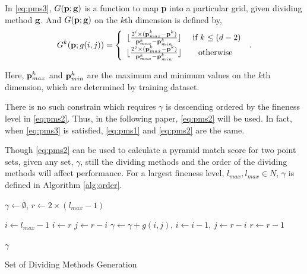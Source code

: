 In \ref{eq:pms3}, $G({\bf p};{\bf g})$ is a function to map {\bf p} into a particular grid, given dividing method ${\bf g}$. And $G({\bf p};{\bf g})$ on the $k$th dimension is defined by,
\[
G^k({\bf p};{g(i,j)})=
 \left\{ \begin{array}{*{20}{c}}
    \lfloor { \frac{2^i \times ({\bf p}_{max}^k - {\bf p}^k) }{{\bf p}_{max}^k - {\bf p}_{min}^k} }  \rfloor    &\mbox{  if } k \le (d-2) \\
    \lfloor { \frac{2^j \times ({\bf p}_{max}^k - {\bf p}^k) }{{\bf p}_{max}^k - {\bf p}_{min}^k} }  \rfloor  &\mbox{otherwise}
\end{array} \right. \:.
\]

Here, ${\bf p}_{max}^k$ and ${\bf p}_{min}^k$ are the maximum and minimum values on the $k$th dimension, which are determined by training dataset.



There is no such constrain which requires $\gamma$ is descending ordered by the fineness level in \ref{eq:pms2}. Thus, in the following paper, \ref{eq:pms2} will be used.
In fact, when \ref{eq:pms3} is satisfied, \ref{eq:pms1} and \ref{eq:pms2} are the same.

Though \ref{eq:pms2} can be used to calculate a pyramid match score for two point sets, given any set, $\gamma$, still the dividing methods and the order of the dividing methods will affect performance. For a largest fineness level, $l_{max},l_{max}\in N$, $\gamma$ is defined in Algorithm \ref{alg:order}.

\begin{algorithm}[chapter]





    \begin{algorithmic}[1]


       \STATE $\gamma \leftarrow \emptyset$, $r \leftarrow 2\times (l_{max}-1)$

        \STATE $i \leftarrow l_{max}-1$
        \ELSE
        \STATE $i \leftarrow r$
        \ENDIF
        \STATE $j \leftarrow r-i$
        \STATE $\gamma \leftarrow \gamma + g(i,j)$, $i \leftarrow i-1$, $j \leftarrow r-i$
        \ENDWHILE
        \STATE $r \leftarrow r-1$
        \ENDWHILE




    \RETURN $\gamma$

    \end{algorithmic}
    \caption{Set of Dividing Methods Generation}
    \label{alg:order}


\end{algorithm}



